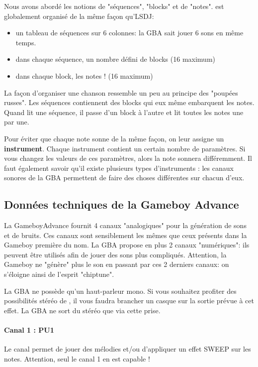 Nous avons abordé les notions de "séquences", "blocks" et de "notes".
\FAT est globalement organisé de la même façon qu'LSDJ:
\medskip

\begin{itemize}
  \item{un tableau de séquences sur 6 colonnes: la GBA sait jouer 6 sons en même temps.}
  \item{dans chaque séquence, un nombre défini de blocks (16 maximum)}
  \item{dans chaque block, les notes ! (16 maximum)}
\end{itemize}
\medskip

La façon d'organiser une chanson ressemble un peu au principe des "poupées russes".
Les séquences contiennent des blocks qui eux même embarquent les notes.
Quand \FAT lit une séquence, il passe d'un block à l'autre et lit toutes les notes une par une.
\medskip

Pour éviter que chaque note sonne de la même façon, on leur assigne un {\bf instrument}.
Chaque instrument contient un certain nombre de paramètres.
Si vous changez les valeurs de ces paramètres, alors la note sonnera différemment.
Il faut également savoir qu'il existe plusieurs types d'instruments : les canaux sonores de la GBA permettent de faire des choses différentes sur chacun d'eux.

\subsection{Données techniques de la Gameboy Advance}

La GameboyAdvance fournit 4 canaux "analogiques" pour la génération de sons et de bruits.
Ces canaux sont sensiblement les mêmes que ceux présents dans la Gameboy première du nom.
La GBA propose en plus 2 canaux "numériques": ils peuvent être utilisés afin de jouer des sons plus compliqués.
Attention, la Gameboy ne "génère" plus le son en passant par ces 2 derniers canaux: on s'éloigne ainsi de l'esprit "chiptune".

La GBA ne possède qu'un haut-parleur mono.
Si vous souhaitez profiter des possibilités stéréo de \FAT, il vous faudra brancher un casque sur la sortie prévue à cet effet.
La GBA ne sort du stéréo que via cette prise.

\paragraph{Canal 1 : PU1} Le canal permet de jouer des mélodies et/ou d'appliquer un effet SWEEP sur les notes. Attention, seul le canal 1 en est capable !

